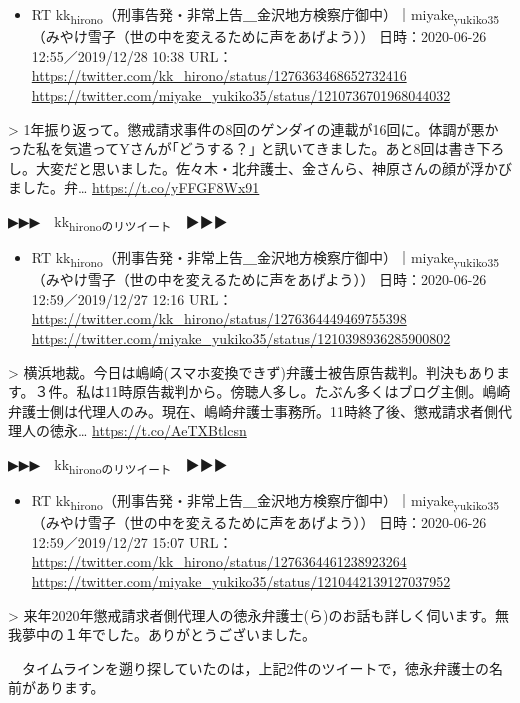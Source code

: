 \documentclass[]{ltjarticle}
\begin{document}
\begin{itemize}
\item RT kk\textsubscript{hirono}（刑事告発・非常上告＿金沢地方検察庁御中）｜miyake\textsubscript{yukiko35}（みやけ雪子（世の中を変えるために声をあげよう）） 日時：2020-06-26 12:55／2019/12/28 10:38 URL： \url{https://twitter.com/kk\_hirono/status/1276363468652732416} \url{https://twitter.com/miyake\_yukiko35/status/1210736701968044032}
\end{itemize}

> 1年振り返って。懲戒請求事件の8回のゲンダイの連載が16回に。体調が悪かった私を気遣ってYさんが｢どうする？｣ と訊いてきました。あと8回は書き下ろし。大変だと思いました。佐々木・北弁護士、金さんら、神原さんの顔が浮かびました。弁… \url{https://t.co/yFFGF8Wx91}  

▶▶▶　kk\textsubscript{hironoのリツイート}　▶▶▶  

\begin{itemize}
\item RT kk\textsubscript{hirono}（刑事告発・非常上告＿金沢地方検察庁御中）｜miyake\textsubscript{yukiko35}（みやけ雪子（世の中を変えるために声をあげよう）） 日時：2020-06-26 12:59／2019/12/27 12:16 URL： \url{https://twitter.com/kk\_hirono/status/1276364449469755398} \url{https://twitter.com/miyake\_yukiko35/status/1210398936285900802}
\end{itemize}

> 横浜地裁。今日は嶋崎(スマホ変換できず)弁護士被告原告裁判。判決もあります。３件。私は11時原告裁判から。傍聴人多し。たぶん多くはブログ主側。嶋崎弁護士側は代理人のみ。現在、嶋崎弁護士事務所。11時終了後、懲戒請求者側代理人の徳永… \url{https://t.co/AeTXBtlcsn}  

▶▶▶　kk\textsubscript{hironoのリツイート}　▶▶▶  

\begin{itemize}
\item RT kk\textsubscript{hirono}（刑事告発・非常上告＿金沢地方検察庁御中）｜miyake\textsubscript{yukiko35}（みやけ雪子（世の中を変えるために声をあげよう）） 日時：2020-06-26 12:59／2019/12/27 15:07 URL： \url{https://twitter.com/kk\_hirono/status/1276364461238923264} \url{https://twitter.com/miyake\_yukiko35/status/1210442139127037952}
\end{itemize}

> 来年2020年懲戒請求者側代理人の徳永弁護士(ら)のお話も詳しく伺います。無我夢中の１年でした。ありがとうございました。  

　タイムラインを遡り探していたのは，上記2件のツイートで，徳永弁護士の名前があります。
\end{document}
